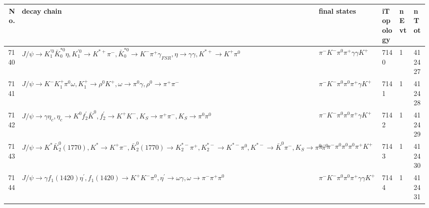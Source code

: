 \begin{table}[htbp] 
\begin{center}
\begin{small}
\begin{tabular}{rlllll}\hline\hline
 No. & decay chain & final states &  iTopology & nEvt & nTot \\\hline
7140&$J/\psi       \rightarrow K_1^{'0}      \bar{K}_0^{*0}\eta          , K_1^{'0}       \rightarrow K^{*+}         \pi^{-}        , \bar{K}_0^{*0} \rightarrow K^{-}          \pi^{+}        \gamma_{FSR} , \eta           \rightarrow \gamma       \gamma       , K^{*+}          \rightarrow K^{+}          \pi^{0}        $&$\pi^{-}        K^{-}          \pi^{0}        \pi^{+}        \gamma       \gamma       K^{+}          $& 7140&    1&412427\\
7141&$J/\psi       \rightarrow K^{-}          K_1^{+}        \pi^{0}        \omega         , K_1^{+}         \rightarrow \rho^{0}      K^{+}          , \omega          \rightarrow \pi^{0}        \gamma       , \rho^{0}       \rightarrow \pi^{+}        \pi^{-}        $&$\pi^{-}        K^{-}          \pi^{0}        \pi^{0}        \pi^{+}        \gamma       K^{+}          $& 7141&    1&412428\\
7142&$J/\psi       \rightarrow \gamma       \eta_{c}    , \eta_{c}     \rightarrow K^{0}          f_2^{'}       \bar{K}^{0}   , f_2^{'}        \rightarrow K^{+}          K^{-}          , K_{S}           \rightarrow \pi^{+}        \pi^{-}        , K_{S}           \rightarrow \pi^{0}        \pi^{0}        $&$\pi^{-}        K^{-}          \pi^{0}        \pi^{0}        \pi^{+}        \gamma       K^{+}          $& 7142&    1&412429\\
7143&$J/\psi       \rightarrow K^{*}          \bar{K}_2^0(1770), K^{*}           \rightarrow K^{+}          \pi^{-}        , \bar{K}_2^0(1770) \rightarrow K_2^{*-}       \pi^{+}        , K_2^{*-}        \rightarrow K^{*-}         \pi^{0}        , K^{*-}          \rightarrow \bar{K}^{0}   \pi^{-}        , K_{S}           \rightarrow \pi^{0}        \pi^{0}        $&$\pi^{-}        \pi^{-}        \pi^{0}        \pi^{0}        \pi^{0}        \pi^{+}        K^{+}          $& 7143&    1&412430\\
7144&$J/\psi       \rightarrow \gamma       f_{1}(1420)    \eta^{\prime} , f_{1}(1420)     \rightarrow K^{+}          K^{-}          \pi^{0}        , \eta^{\prime}  \rightarrow \omega         \gamma       , \omega          \rightarrow \pi^{-}        \pi^{+}        \pi^{0}        $&$\pi^{-}        K^{-}          \pi^{0}        \pi^{0}        \pi^{+}        \gamma       \gamma       K^{+}          $& 7144&    1&412431\\

\end{tabular}
\end{small}
\end{center}
\end{table}
